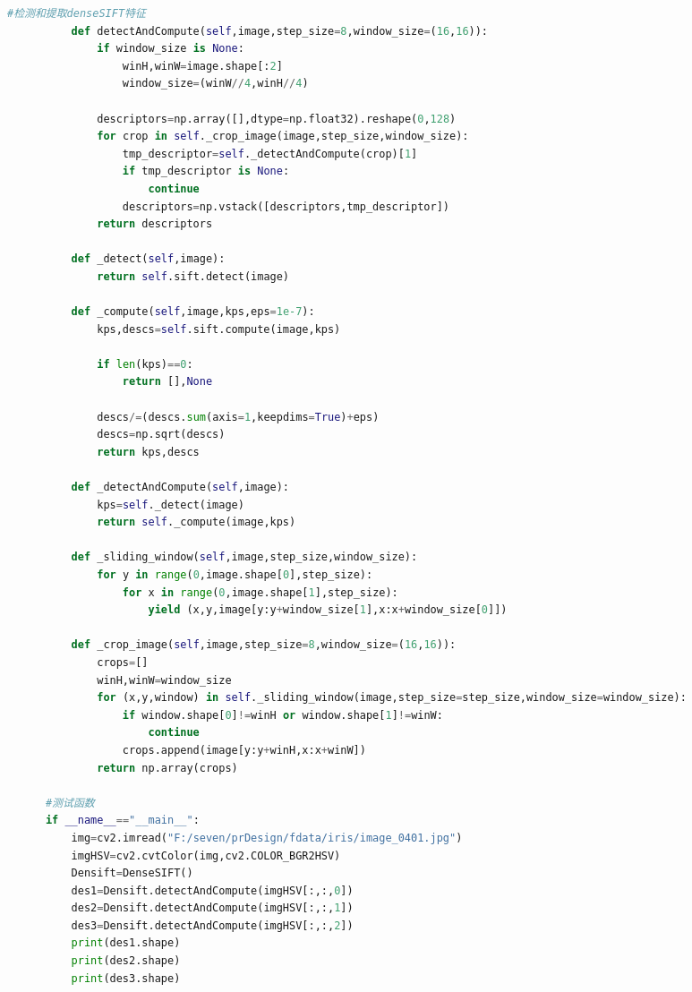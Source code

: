 \documentclass[supercite]{HustGraduPaper}
\begin{document}
\begin{sloppypar}
\begin{appendices}
\begin{spacing}{1.25}
\begin{lstlisting}[language=python]
          #检测和提取denseSIFT特征
          def detectAndCompute(self,image,step_size=8,window_size=(16,16)):
              if window_size is None:
                  winH,winW=image.shape[:2]
                  window_size=(winW//4,winH//4)
      
              descriptors=np.array([],dtype=np.float32).reshape(0,128)
              for crop in self._crop_image(image,step_size,window_size):
                  tmp_descriptor=self._detectAndCompute(crop)[1]
                  if tmp_descriptor is None:
                      continue
                  descriptors=np.vstack([descriptors,tmp_descriptor])
              return descriptors
      
          def _detect(self,image):
              return self.sift.detect(image)
      
          def _compute(self,image,kps,eps=1e-7):
              kps,descs=self.sift.compute(image,kps)
      
              if len(kps)==0:
                  return [],None
      
              descs/=(descs.sum(axis=1,keepdims=True)+eps)
              descs=np.sqrt(descs)
              return kps,descs
          
          def _detectAndCompute(self,image):
              kps=self._detect(image)
              return self._compute(image,kps)
      
          def _sliding_window(self,image,step_size,window_size):
              for y in range(0,image.shape[0],step_size):
                  for x in range(0,image.shape[1],step_size):
                      yield (x,y,image[y:y+window_size[1],x:x+window_size[0]])
      
          def _crop_image(self,image,step_size=8,window_size=(16,16)):
              crops=[]
              winH,winW=window_size
              for (x,y,window) in self._sliding_window(image,step_size=step_size,window_size=window_size):
                  if window.shape[0]!=winH or window.shape[1]!=winW:
                      continue
                  crops.append(image[y:y+winH,x:x+winW])
              return np.array(crops)
      
      #测试函数
      if __name__=="__main__":
          img=cv2.imread("F:/seven/prDesign/fdata/iris/image_0401.jpg")
          imgHSV=cv2.cvtColor(img,cv2.COLOR_BGR2HSV)
          Densift=DenseSIFT()
          des1=Densift.detectAndCompute(imgHSV[:,:,0])
          des2=Densift.detectAndCompute(imgHSV[:,:,1])
          des3=Densift.detectAndCompute(imgHSV[:,:,2])
          print(des1.shape)
          print(des2.shape)
          print(des3.shape)
    \end{lstlisting}
  \end{spacing}
  

\end{appendices}
\end{sloppypar}
\end{document}

